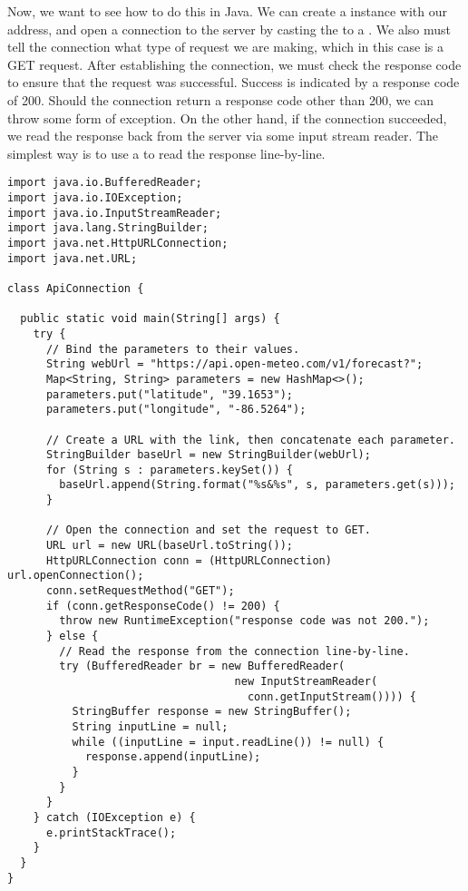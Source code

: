 Now, we want to see how to do this in Java. We can create a  instance with our address, and open a connection to the server by casting the  to a . We also must tell the connection what type of request we are making, which in this case is a GET request. After establishing the connection, we must check the response code to ensure that the request was successful. Success is indicated by a response code of 200. Should the connection return a response code other than 200, we can throw some form of exception. On the other hand, if the connection succeeded, we read the response back from the server via some input stream reader. The simplest way is to use a  to read the response line-by-line.

\begin{lstlisting}[language=MyJava]
import java.io.BufferedReader;
import java.io.IOException;
import java.io.InputStreamReader;
import java.lang.StringBuilder;
import java.net.HttpURLConnection;
import java.net.URL;

class ApiConnection {

  public static void main(String[] args) {
    try {
      // Bind the parameters to their values.
      String webUrl = "https://api.open-meteo.com/v1/forecast?";
      Map<String, String> parameters = new HashMap<>();
      parameters.put("latitude", "39.1653");
      parameters.put("longitude", "-86.5264");

      // Create a URL with the link, then concatenate each parameter.
      StringBuilder baseUrl = new StringBuilder(webUrl);
      for (String s : parameters.keySet()) { 
        baseUrl.append(String.format("%s&%s", s, parameters.get(s))); 
      }
    
      // Open the connection and set the request to GET.
      URL url = new URL(baseUrl.toString());
      HttpURLConnection conn = (HttpURLConnection) url.openConnection();
      conn.setRequestMethod("GET");
      if (conn.getResponseCode() != 200) {
        throw new RuntimeException("response code was not 200.");
      } else {
        // Read the response from the connection line-by-line.
        try (BufferedReader br = new BufferedReader(
                                   new InputStreamReader(
                                     conn.getInputStream()))) {
          StringBuffer response = new StringBuffer();
          String inputLine = null;
          while ((inputLine = input.readLine()) != null) { 
            response.append(inputLine); 
          }
        }
      }
    } catch (IOException e) {
      e.printStackTrace();
    }
  }
}
\end{lstlisting}

